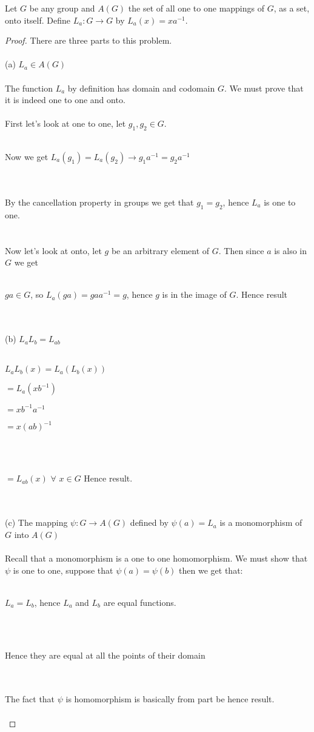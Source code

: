 \documentclass[12pt]{article}
\newenvironment{problem}[2][Problem]{\begin{trivlist}
\item[\hskip \labelsep {\bfseries #1}\hskip \labelsep {\bfseries #2.}]}{\end{trivlist}}
\begin{document}
\begin{problem}{2.5.3}
Let $G$ be any group and $A(G)$ the set of all one to one mappings of $G$, as a set, onto itself. Define $L_a: G \rightarrow G$ by $L_a(x)=xa^{-1}$.
\end{problem}

\begin{proof}
There are three parts to this problem. \\ \\
(a) $L_a \in A(G)$ \\ \\
The function $L_a$ by definition has domain and codomain $G$. We must prove that it is indeed one to one and onto. \\ \\
First let's look at one to one, let $g_1,g_2 \in G$. \\ \\
\centerline{Now we get $L_a(g_1)=L_a(g_2) \rightarrow g_1a^{-1} = g_2a^{-1}$} \\ \\
By the cancellation property in groups we get that $g_1 = g_2$, hence $L_a$ is one to one. \\ \\ \\
Now let's look at onto, let $g$ be an arbitrary element of $G$. Then since $a$ is also in $G$ we get \\ \\
\centerline{$ga \in G$, so $L_a(ga)=gaa^{-1}=g$, hence $g$ is in the image of $G$. Hence result }\\ \\

(b) $L_aL_b=L_{ab}$ \\ \\
\centerline{$L_aL_b(x) =L_a(L_b(x))$}
\centerline{$=L_a(xb^{-1})$}
\centerline{$=xb^{-1}a^{-1}$}
\centerline{$=x(ab)^{-1}$}\\ \\
\centerline{$=L_{ab}(x)$ $\forall$ $x \in G$ Hence result.}  \\ \\

(c) The mapping $\psi: G \rightarrow A(G)$ defined by $\psi (a) = L_a$ is a monomorphism of $G$ into $A(G)$ \\ \\
Recall that a monomorphism is a one to one homomorphism. We must show that $\psi$ is one to one, suppose that $\psi(a) = \psi(b)$ then we get that:  \\ \\
\centerline{$L_a=L_b$, hence $L_a$ and $L_b$ are equal functions.} \\ \\
\centerline{Hence they are equal at all the points of their domain}\\ \\
The fact that $\psi$ is homomorphism is basically from part be hence result. \\ \\
\end{proof}
\end{document}
